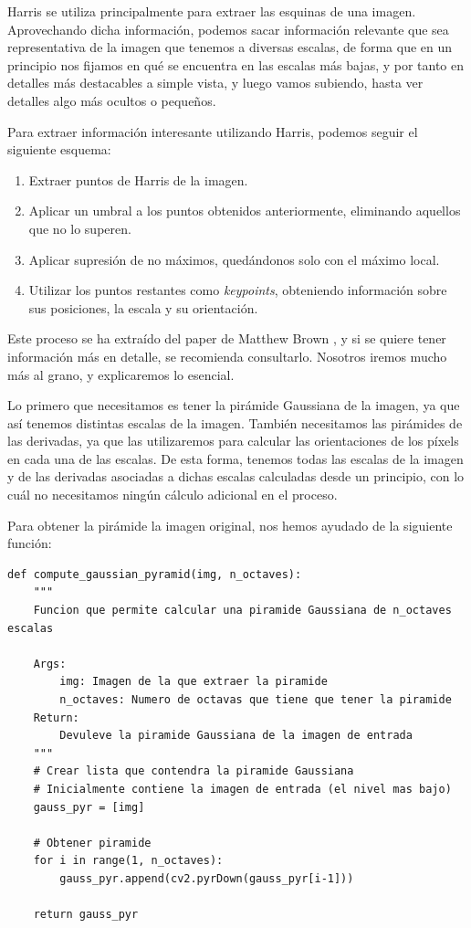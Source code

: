 \documentclass[11pt,a4paper]{article}
\begin{document}
Harris se utiliza principalmente para extraer las esquinas de una
imagen. Aprovechando dicha información, podemos sacar información
relevante que sea representativa de la imagen que tenemos a diversas escalas,
de forma que en un principio nos fijamos en qué se encuentra en las escalas
más bajas, y por tanto en detalles más destacables a simple vista, y luego
vamos subiendo, hasta ver detalles algo más ocultos o pequeños.

Para extraer información interesante utilizando Harris, podemos seguir el siguiente
esquema:

\begin{enumerate}
	\item Extraer puntos de Harris de la imagen.
	\item Aplicar un umbral a los puntos obtenidos anteriormente, eliminando
	aquellos que no lo superen.
	\item Aplicar supresión de no máximos, quedándonos solo con el máximo
	local.
	\item Utilizar los puntos restantes como \textit{keypoints}, obteniendo
	información sobre sus posiciones, la escala y su orientación.
\end{enumerate}

Este proceso se ha extraído del paper de Matthew Brown  \cite{patches}, y si se
quiere tener información más en detalle, se recomienda consultarlo. Nosotros iremos
mucho más al grano, y explicaremos lo esencial.

Lo primero que necesitamos es tener la pirámide Gaussiana de la imagen, ya
que así tenemos distintas escalas de la imagen. También necesitamos las pirámides
de las derivadas, ya que las utilizaremos para calcular las orientaciones de los píxels
en cada una de las escalas. De esta forma, tenemos todas las escalas de la imagen
y de las derivadas asociadas a dichas escalas calculadas desde un principio, con lo
cuál no necesitamos ningún cálculo adicional en el proceso.

Para obtener la pirámide la imagen original, nos hemos ayudado de la siguiente
función:

\begin{lstlisting}
def compute_gaussian_pyramid(img, n_octaves):
    """
	Funcion que permite calcular una piramide Gaussiana de n_octaves escalas
	
    Args:
        img: Imagen de la que extraer la piramide
        n_octaves: Numero de octavas que tiene que tener la piramide
    Return:
        Devuleve la piramide Gaussiana de la imagen de entrada
    """
    # Crear lista que contendra la piramide Gaussiana
    # Inicialmente contiene la imagen de entrada (el nivel mas bajo)
    gauss_pyr = [img]

    # Obtener piramide
    for i in range(1, n_octaves):
        gauss_pyr.append(cv2.pyrDown(gauss_pyr[i-1]))
    
    return gauss_pyr
\end{lstlisting}
\end{document}

